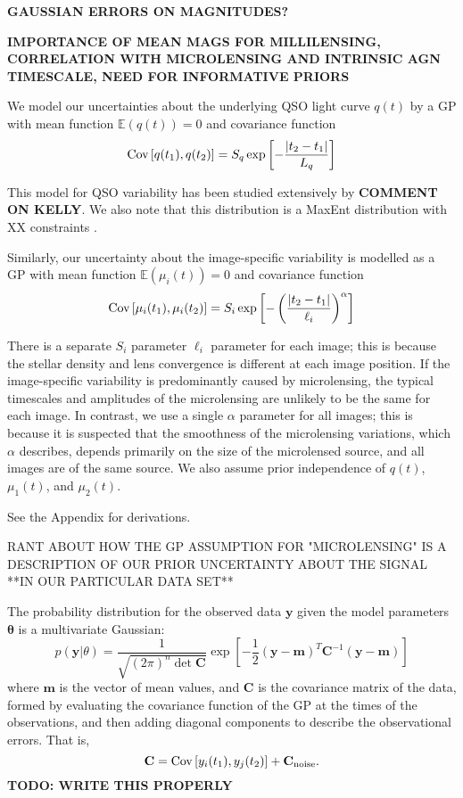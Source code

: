 \documentclass[useAMS,usenatbib, a4paper]{mn2e} \usepackage{natbib}
\begin{document}
{\bf GAUSSIAN ERRORS ON MAGNITUDES?}

{\bf IMPORTANCE OF MEAN MAGS FOR MILLILENSING, CORRELATION WITH MICROLENSING AND INTRINSIC AGN TIMESCALE, NEED FOR INFORMATIVE PRIORS}

We model our uncertainties about the underlying QSO light curve $q(t)$ by
a GP with mean function $\mathds{E}\left(q(t)\right) = 0$ and covariance function
\begin{eqnarray}
\textnormal{Cov}\left[q(t_1), q(t_2)\right] = S_q\exp
\left[-\frac{|t_2 - t_1|}{L_q}\right]
\end{eqnarray}

This model for QSO variability has been studied extensively by \citep{}
{\bf COMMENT ON KELLY}. We also note that this distribution is a MaxEnt
distribution \citep{} with XX constraints \citep{sivia}.

Similarly, our uncertainty about the image-specific variability is modelled
as a GP with mean function $\mathds{E}\left(\mu_i(t)\right) = 0$ and
covariance function
\begin{eqnarray}
\textnormal{Cov}\left[\mu_i(t_1), \mu_i(t_2)\right] =
S_i\exp\left[
-\left(\frac{|t_2 - t_1|
}{\ell_i}\right)^\alpha
\right]
\end{eqnarray}

There is a separate $S_i$ parameter $\ell_i$ parameter
for each image; this is because the stellar density and lens convergence is
different at each image position. If the image-specific variability is
predominantly caused by microlensing, the typical timescales and amplitudes
of the microlensing are unlikely to be the same for each image.
In contrast, we use a single $\alpha$ parameter for all images;
this is because it is suspected that the
smoothness of the microlensing variations, which $\alpha$ describes, depends
primarily on the size of the microlensed source, and all images are of the
same source. We also assume
prior independence of $q(t)$, $\mu_1(t)$, and $\mu_2(t)$.

See the Appendix for derivations.


{RANT ABOUT HOW THE GP ASSUMPTION FOR "MICROLENSING" IS A DESCRIPTION OF OUR
PRIOR UNCERTAINTY ABOUT THE SIGNAL **IN OUR PARTICULAR DATA SET**}

The probability distribution for the observed data $\mathbf{y}$ given the
model parameters $\boldsymbol{\theta}$ is a multivariate Gaussian:
\begin{equation}
p(\mathbf{y} | \theta) = \frac{1}{\sqrt{(2\pi)^n \det \mathbf{C}}}
\exp\left[-\frac{1}{2}
(\mathbf{y} - \mathbf{m})^T\mathbf{C}^{-1}(\mathbf{y} - \mathbf{m})\right]
\end{equation}
where $\mathbf{m}$ is the vector of mean values, and $\mathbf{C}$ is the
covariance matrix of the data, formed by evaluating the covariance function of
the GP at the times of the observations, and then adding diagonal components
to describe the observational errors. That is,
\begin{equation}
\mathbf{C} = \textnormal{Cov}\left[y_i(t_1), y_j(t_2)\right] + \mathbf{C}_{\rm noise}.
\end{equation}
{\bf TODO: WRITE THIS PROPERLY}
\end{document}
